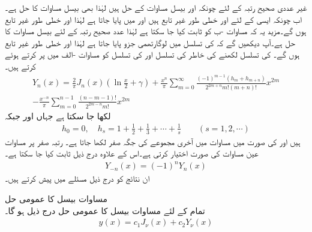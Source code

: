 غیر عددی صحیح رتبہ  کے لئے چونکہ  اور  بیسل مساوات کے حل ہیں لہٰذا    بھی بیسل مساوات کا حل ہے۔اب چونکہ ایسی  کے لئے  اور  خطی طور غیر تابع ہیں اور  میں  پایا جاتا ہے لہٰذا  اور  خطی طور غیر تابع ہوں گے۔مزید یہ کہ مساوات -ب کو ثابت  کیا جا سکتا ہے لہٰذا عدد صحیح رتبہ کے لئے  بیسل مساوات کا حل ہے۔آپ دیکھیں گے کہ  کی تسلسل میں لوگارتھمی جزو پایا جاتا ہے لہٰذا  اور  خطی طور غیر تابع ہوں گے۔ کی تسلسل لکھنے کی خاطر  کی تسلسل  اور  کی تسلسل  کو مساوات -الف میں پر کرتے ہوئے  کرتے ہیں۔
\begin{multline}\label{مساوات_بیسل_نیومن_عدد_صحیح_الف}
Y_n(x)=\frac{2}{\pi}J_n(x)\left(\ln \frac{x}{2}+\gamma\right)+\frac{x^n}{\pi}\sum_{m=0}^{\infty} \frac{(-1)^{m-1}(h_m+h_{m+n})}{2^{2m+n}m!(m+n)!}x^{2m}\\
-\frac{x^{-n}}{\pi}\sum_{m=0}^{n-1}\frac{(n-m-1)!}{2^{2m-n}m!}x^{2m}
\end{multline}
لکھا جا سکتا ہے جہاں  اور   جبکہ
\begin{align*}
h_0=0,\quad h_s=1+\frac{1}{2}+\frac{1}{3}+\cdots+\frac{1}{s} \quad \quad (s=1,2,\cdots)
\end{align*}
ہیں اور  کی صورت میں مساوات  میں آخری مجموعے کی جگہ صفر لکھا جاتا ہے۔ رتبہ صفر  پر  مساوات  عین مساوات  کی صورت اختیار کرتی ہے۔اس کے علاوہ درج ذیل ثابت کیا جا سکتا ہے۔
\begin{align}
Y_{-n}(x)=(-1)^nY_n(x)
\end{align}
ان نتائج کو درج ذیل مسئلے میں پیش کرتے ہیں۔

 مساوات بیسل کا عمومی حل\\
تمام  کے لئے مساوات بیسل کا عمومی حل درج ذیل ہو گا۔
\begin{align}
y(x)=c_1J_{\nu}(x)+c_2Y_{\nu}(x)
\end{align}

